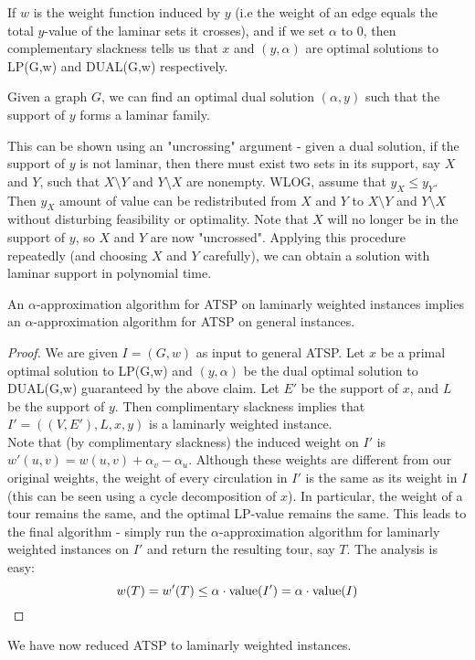 \documentclass[./main.tex]{subfiles}
\begin{document}
If $w$ is the weight function induced by $y$ (i.e the weight of an edge equals the total $y$-value of the laminar sets it crosses), and if we set $\alpha$ to $0$, then complementary slackness tells us that $x$ and $(y,\alpha)$ are optimal solutions to LP(G,w) and DUAL(G,w) respectively.\vspace{4mm}
\begin{claim*}Given a graph $G$, we can find an optimal dual solution $(\alpha, y)$ such that the support of $y$ forms a laminar family.\end{claim*}
	This can be shown using an "uncrossing" argument - given a dual solution, if the support of $y$ is not laminar, then there must exist two sets in its support, say $X$ and $Y$, such that $X\setminus Y$ and $Y\setminus X$ are nonempty. WLOG, assume that $y_X \leq y_Y$. Then $y_X$ amount of value can be redistributed from $X$ and $Y$ to $X\setminus Y$ and $Y\setminus X$ without disturbing feasibility or optimality. Note that $X$ will no longer be in the support of $y$, so $X$ and $Y$ are now "uncrossed". Applying this procedure repeatedly (and choosing $X$ and $Y$ carefully), we can obtain a solution with laminar support in polynomial time.\vspace{4mm}\\
	\begin{minipage}{\textwidth}\begin{theorem} An $\alpha$-approximation algorithm for ATSP on laminarly weighted instances implies an $\alpha$-approximation algorithm for ATSP on general instances.
		\end{theorem}
		\begin{proof} We are given $I=(G,w)$ as input to general ATSP. Let $x$ be a primal optimal solution to LP(G,w) and $(y,\alpha)$ be the dual optimal solution to DUAL(G,w) guaranteed by the above claim. Let $E'$ be the support of $x$, and $L$ be the support of $y$. Then complimentary slackness implies that $I'=((V,E'), L, x, y)$ is a laminarly weighted instance.\vspace{2mm}
			\\Note that (by complimentary slackness) the induced weight on $I'$ is $w'(u,v) = w(u,v) + \alpha_v - \alpha_u$. Although these weights are different from our original weights, the weight of every circulation in $I'$ is the same as its weight in $I$ (this can be seen using a cycle decomposition of $x$). In particular, the weight of a tour remains the same, and the optimal LP-value remains the same. This leads to the final algorithm - simply run the $\alpha$-approximation algorithm for laminarly weighted instances on $I'$ and return the resulting tour, say $T$. The analysis is easy: \[w(T) = w'(T)\leq \alpha\cdot \textup{value}(I') = \alpha\cdot\textup{value}(I)\]
		\end{proof}\end{minipage}\vspace{6mm}
		We have now reduced ATSP to laminarly weighted instances.\vspace{2mm}
\end{document}
